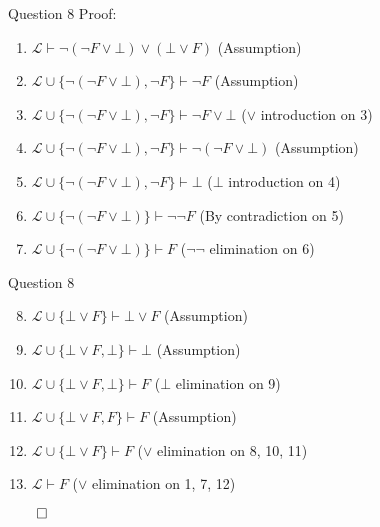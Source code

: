 \documentclass{beamer}
\begin{document}
{\begin{frame}{Question 8}
            Proof:
            \begin{enumerate}
                \item $\mathcal{L} \vdash \neg (\neg F \lor \bot) \lor (\bot \lor F)$ (Assumption)
                \item $\mathcal{L} \cup \{\neg (\neg F \lor \bot), \neg F\} \vdash \neg F$ (Assumption)
                \item $\mathcal{L} \cup \{\neg (\neg F \lor \bot), \neg F\} \vdash \neg F \lor \bot$ ($\lor$ introduction on 3)
                \item $\mathcal{L} \cup \{\neg (\neg F \lor \bot), \neg F\} \vdash \neg (\neg F \lor \bot)$ (Assumption)
                \item $\mathcal{L} \cup \{\neg (\neg F \lor \bot), \neg F\} \vdash \bot$ ($\bot$ introduction on 4)
                \item $\mathcal{L} \cup \{\neg (\neg F \lor \bot)\} \vdash \neg \neg F$ (By contradiction on 5)
                \item $\mathcal{L} \cup \{\neg (\neg F \lor \bot)\} \vdash F$ ($\neg \neg$ elimination on 6)
            \end{enumerate}
        \end{frame}
        \begin{frame}{Question 8}
            \begin{enumerate}
                \setcounter{enumi}{7}
                \item $\mathcal{L} \cup \{\bot \lor F\} \vdash \bot \lor F$ (Assumption)
                \item $\mathcal{L} \cup \{\bot \lor F, \bot\} \vdash \bot$ (Assumption)
                \item $\mathcal{L} \cup \{\bot \lor F, \bot \} \vdash F$ ($\bot$ elimination on 9)
                \item $\mathcal{L} \cup \{\bot \lor F, F\} \vdash F$ (Assumption)
                \item $\mathcal{L} \cup \{\bot \lor F\} \vdash F$ ($\lor$ elimination on 8, 10, 11)
                \item $\mathcal{L} \vdash F$ ($\lor$ elimination on 1, 7, 12)
            \end{enumerate}
            $\qed$
        \end{frame}
    }
\end{document}
